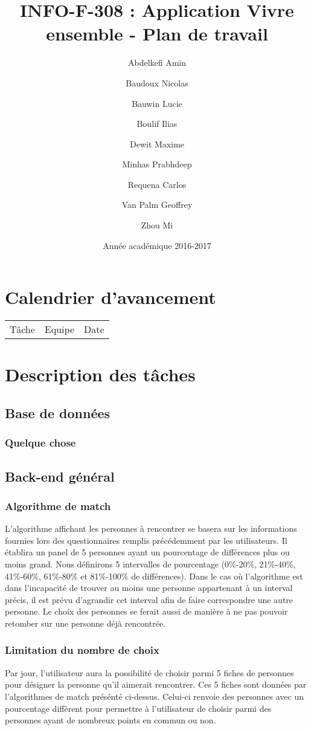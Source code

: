 \documentclass[10pt]{article}
\title{INFO-F-308 : Application Vivre ensemble - Plan de travail}
\author{Abdelkefi Amin \and Baudoux Nicolas \and Bauwin Lucie \and Boulif Ilias \and Dewit Maxime \and  Minhas Prabhdeep \and Requena Carlos \and Van Palm Geoffrey \and Zhou Mi}
\date{Année académique 2016-2017}
\begin{document}
 
 \maketitle
 
 \section{Calendrier d'avancement}
  \begin{tabular}{ l | c | r }
   Tâche & Equipe & Date \\ 
  \end{tabular}
 
 \section{Description des tâches}
  \subsection{Base de données}
   \subsubsection{Quelque chose}
   
  \subsection{Back-end général}
   \subsubsection{Algorithme de match}
    L’algorithme affichant les personnes à rencontrer se basera sur les informations fournies lors des questionnaires remplis précédemment
    par les utilisateurs. 
    Il établira un panel de 5 personnes ayant un pourcentage de différences plus ou moins grand.
    Nous définirons 5 intervalles de pourcentage (0\%-20\%, 21\%-40\%, 41\%-60\%, 61\%-80\% et 81\%-100\% de différences).   
    Dans le cas où l’algorithme est dans l’incapacité de trouver au moins une personne appartenant à un interval précis,
    il est prévu d’agrandir cet interval afin de faire correspondre une autre personne.
    Le choix des personnes se ferait aussi de manière à ne pas pouvoir retomber sur une personne déjà rencontrée. 
   \subsubsection{Limitation du nombre de choix}
    Par jour, l'utilisateur aura la possibilité de choisir parmi 5 fiches de personnes pour désigner la personne qu'il aimerait rencontrer. 
    Ces 5 fiches sont données par l'algorithmes de match présénté ci-dessus. 
    Celui-ci renvoie des personnes avec un pourcentage diffèrent pour permettre à l'utilisateur de choisir parmi des personnes ayant de 
    nombreux points en commun ou non.    
\end{document}
